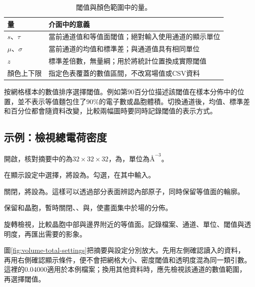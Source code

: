 \begin{table}[htbp]
\centering
\caption{閾值與顏色範圍中的量。}
\begin{tabularx}{\linewidth}{lX}
\toprule
量 & 介面中的意義\\
\midrule
$s$、$\tau$ & 當前通道值和等值面閾值；絕對輸入使用通道的顯示單位\\
$\mu$、$\sigma$ & 當前通道的均值和標準差；與通道值具有相同單位\\
$z$ & 標準差倍數，無量綱；用於將統計位置換成實際閾值\\
顏色上下限 & 指定色表覆蓋的數值區間，不改寫場值或CSV資料\\
\bottomrule
\end{tabularx}
\end{table}

按網格樣本的數值排序選擇閾值。例如第90百分位描述該閾值在樣本分佈中的位置，並不表示等值麵包住了90\%的電子數或晶胞體積。切換通道後，均值、標準差和百分位都會隨資料改變，比較兩幅圖時要同時記錄閾值的表示方式。

\subsection{示例：檢視總電荷密度}

\begin{steps}
  \item 開啟，核對摘要中的為$32\times32\times32$，為，單位為$\text{\AA}^{-3}$。
  \item 在顯示設定中選擇，將設為。勾選，在其中輸入。
  \item 關閉，將設為。這樣可以透過部分表面辨認內部原子，同時保留等值面的輪廓。
  \item 保留和晶胞，暫時關閉、、與，使畫面集中於場的分佈。
  \item 旋轉檢視，比較晶胞中部與邊界附近的等值面。記錄檔案、通道、單位、閾值與透明度，再匯出需要的影象。
\end{steps}

圖\ref{fig:volume-total-settings}把摘要與設定分別放大。先用左側確認讀入的資料，再用右側確認顯示條件，便不會把網格大小、密度閾值和透明度混為同一類引數。這裡的0.04000適用於本例檔案；換用其他資料時，應先檢視該通道的數值範圍，再選擇閾值。

